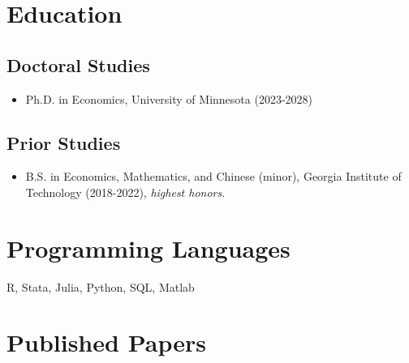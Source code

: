 \documentclass{cv_style}
\begin{document}

    \begin{center}  

    
	\end{center}
	

	\section{Education}
		\subsection{Doctoral Studies}
				\begin{itemize}
					\item Ph.D. in Economics, University of Minnesota (2023-2028)
				\end{itemize}
				
		\subsection{Prior Studies}
				\begin{itemize}
					\item B.S. in Economics, Mathematics, and Chinese (minor), Georgia Institute of Technology (2018-2022), \textit{highest honors}.
				\end{itemize}
		
    \section{Programming Languages}
    R, Stata, Julia, Python, SQL, Matlab
	\section{Published Papers}
		\begin{etaremune}			
					\item {}
					
					
		\end{etaremune}
		
\end{document}
